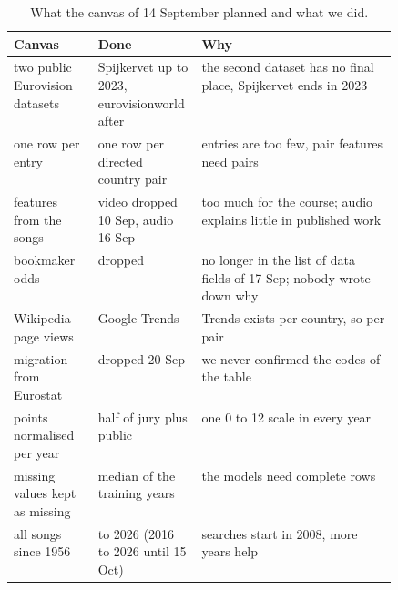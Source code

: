 \begin{table}[t]
\centering\small
\caption{What the canvas of 14 September planned and what we did.}
\label{tab:changes}
\begin{tabularx}{\linewidth}{@{}>{\raggedright\arraybackslash}p{0.22\linewidth}>{\raggedright\arraybackslash}p{0.27\linewidth}>{\raggedright\arraybackslash}X@{}}
\toprule
Canvas & Done & Why \\
\midrule
two public Eurovision datasets & Spijkervet up to 2023, eurovisionworld after & the second dataset has no final place, Spijkervet ends in 2023 \\
one row per entry & one row per directed country pair & 462 entries are too few, pair features need pairs \\
features from the songs & video dropped 10 Sep, audio 16 Sep & too much for the course; audio explains little in published work \\
bookmaker odds & dropped & no longer in the list of data fields of 17 Sep; nobody wrote down why \\
Wikipedia page views & Google Trends & Trends exists per country, so per pair \\
migration from Eurostat & dropped 20 Sep & we never confirmed the codes of the table \\
points normalised per year & half of jury plus public & one 0 to 12 scale in every year \\
missing values kept as missing & median of the training years & the models need complete rows \\
all songs since 1956 & 2008 to 2026 (2016 to 2026 until 15 Oct) & searches start in 2008, more years help \\
\bottomrule
\end{tabularx}
\end{table}
